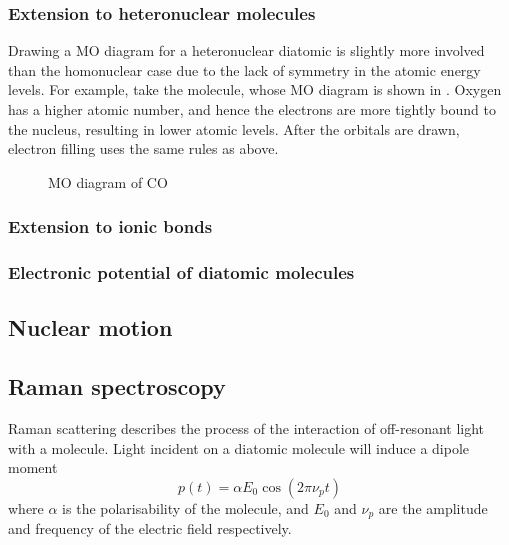 
\subsubsection{Extension to heteronuclear molecules}


Drawing a MO diagram for a heteronuclear diatomic is slightly more involved than
the homonuclear case due to the lack of symmetry in the atomic energy levels.
For example, take the  molecule, whose MO diagram is shown in
. Oxygen has a higher atomic number, and hence the
electrons are more tightly bound to the nucleus, resulting in lower atomic
levels. After the orbitals are drawn, electron filling uses the same rules as
above.

\begin{figure}
  \caption{MO diagram of CO}
  \label{diaspec:fig:CO}
\end{figure}



\subsubsection{Extension to ionic bonds}

\subsubsection{Electronic potential of diatomic molecules}




\subsection{Nuclear motion}

\subsection{Raman spectroscopy}

Raman scattering describes the process of the interaction of off-resonant light
with a molecule.  Light incident on a diatomic molecule will induce a dipole
moment
%
\begin{equation}
  p(t) = \alpha E_0 \cos(2\pi\nu_p t)
\end{equation}
%
where $\alpha$ is the polarisability of the molecule, and $E_0$ and $\nu_p$ are
the amplitude and frequency of the electric field respectively.

